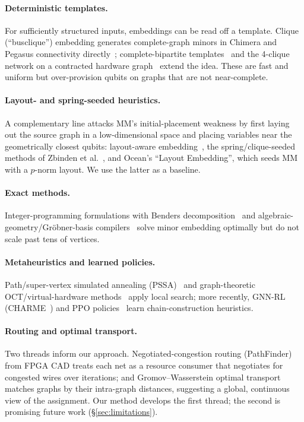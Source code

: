 \documentclass[acmsmall,anonymous,nonacm]{acmart}
\begin{document}
\paragraph{Deterministic templates.}
For sufficiently structured inputs, embeddings can be read off a template.
Clique (``busclique'') embedding generates complete-graph minors in Chimera and
Pegasus connectivity directly~\cite{boothby2016clique}; complete-bipartite
templates~\cite{sinno2025bipartite} and the 4-clique network on a contracted
hardware graph~\cite{pelofske2024fourclique} extend the idea. These are fast and
uniform but over-provision qubits on graphs that are not near-complete.

\paragraph{Layout- and spring-seeded heuristics.}
A complementary line attacks MM's initial-placement weakness by first laying out
the source graph in a low-dimensional space and placing variables near the
geometrically closest qubits: layout-aware embedding~\cite{pinilla2019layout},
the spring/clique-seeded methods of Zbinden et al.~\cite{zbinden2020embedding},
and Ocean's ``Layout Embedding'', which seeds MM with a $p$-norm layout. We use
the latter as a baseline.

\paragraph{Exact methods.}
Integer-programming formulations with Benders
decomposition~\cite{bernal2020ip} and algebraic-geometry/Gr\"obner-basis
compilers~\cite{dridi2018algebraic} solve minor embedding optimally but do not
scale past tens of vertices.

\paragraph{Metaheuristics and learned policies.}
Path/super-vertex simulated annealing (PSSA)~\cite{sugie2018pssa} and
graph-theoretic OCT/virtual-hardware methods~\cite{goodrich2018oct} apply local
search; more recently, GNN-RL (CHARME~\cite{ngo2024charme}) and PPO
policies~\cite{nembrini2025ppo} learn chain-construction heuristics.

\paragraph{Routing and optimal transport.}
Two threads inform our approach. Negotiated-congestion routing
(PathFinder)~\cite{mcmurchie1995pathfinder} from FPGA CAD treats each net as a
resource consumer that negotiates for congested wires over iterations; and
Gromov--Wasserstein optimal transport~\cite{xu2019gwl,vincentcuaz2022srgw}
matches graphs by their intra-graph distances, suggesting a global, continuous
view of the assignment. Our method develops the first thread; the second is
promising future work (\S\ref{sec:limitations}).
\end{document}
